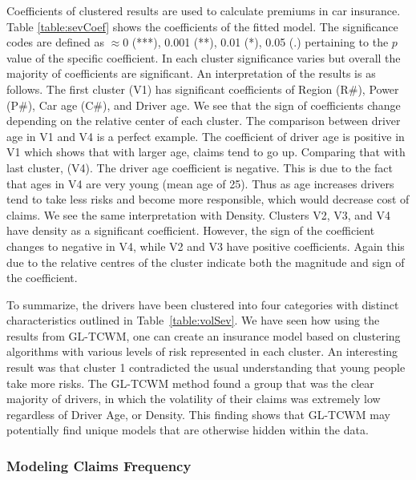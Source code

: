 \documentclass[11pt,letterpaper]{article}
\numberwithin{equation}{section}
\numberwithin{equation}{section}
\numberwithin{equation}{section}
\begin{document}
Coefficients of clustered results are used to calculate premiums in car insurance. Table  \ref{table:sevCoef} shows the coefficients of the fitted model. The significance codes are defined as $\approx 0$  (***), 0.001 (**), 0.01 (*), 0.05 (.) %
pertaining to the $p$ value of the specific coefficient. In each cluster significance varies but overall the majority of coefficients are significant. An interpretation of the results is as follows. The first cluster (V1) has significant coefficients of Region (R\#),  Power (P\#), Car age (C\#), and Driver age. We see that the sign of coefficients change depending on the relative center of each cluster. The comparison between driver age in V1 and V4 is a perfect example. The coefficient of driver age is positive in V1 which shows that with larger age, claims tend to go up. Comparing that with last cluster, (V4). The driver age coefficient is negative. This is due to the fact that ages in V4 are very young (mean age of 25). Thus as age increases drivers tend to take less risks and become more responsible, which would decrease cost of claims. We see the same interpretation with Density. Clusters V2, V3, and V4  have density as a significant coefficient. However, the sign of the coefficient changes to negative in V4, while V2 and V3 have positive coefficients. Again this due to the relative centres of the cluster indicate both the magnitude and sign of the coefficient.%

To summarize, the drivers have been clustered into four categories with distinct characteristics outlined in Table~\ref{table:volSev}. We have seen how using the results from GL-TCWM, one can create an insurance model based on clustering algorithms with various levels of risk represented in each cluster. An interesting result was that cluster 1 contradicted the usual understanding that young people take more risks. %
The GL-TCWM method found a group that was the clear majority of drivers, in which the volatility of their claims was extremely low regardless of Driver Age, or Density. This finding shows that GL-TCWM may potentially find unique models that are otherwise hidden within the data.


 \subsubsection{Modeling Claims Frequency}
\end{document}
